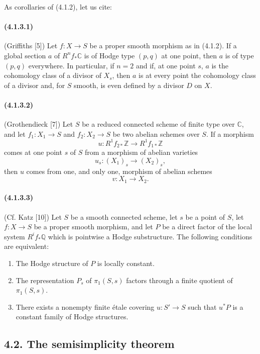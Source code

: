 \documentclass[10pt]{article}
\newcommand{\C}{\mathbb C}
\newcommand{\Q}{\mathbb Q}
\newcommand{\Z}{\mathbb Z}
\begin{document}
As corollaries of (4.1.2), let us cite:

\paragraph{(4.1.3.1)} (Griffiths [5]) Let $f:X\to S$ be a proper smooth morphism as in (4.1.2). If a global section $a$ of $R^nf_*\C$ is of Hodge type $(p,q)$ at one point, then $a$ is of type $(p,q)$ everywhere. In particular, if $n=2$ and if, at one point $s$, $a$ is the cohomology class of a divisor of $X_s$, then $a$ is at every point the cohomology class of a divisor and, for $S$ smooth, is even defined by a divisor $D$ on $X$.

\paragraph{(4.1.3.2)} (Grothendieck [7]) Let $S$ be a reduced connected scheme of finite type over $\C$, and let $f_1:X_1\to S$ and $f_2:X_2\to S$ be two abelian schemes over $S$. If a morphism
\[
u:R^1f_{2*}\Z\longrightarrow R^1f_{1*}\Z
\]
comes at one point $s$ of $S$ from a morphism of abelian varieties
\[
u_s:(X_1)_s\longrightarrow (X_2)_s,
\]
then $u$ comes from one, and only one, morphism of abelian schemes
\[
v:X_1\longrightarrow X_2.
\]

\paragraph{(4.1.3.3)} (Cf. Katz [10]) Let $S$ be a smooth connected scheme, let $s$ be a point of $S$, let $f:X\to S$ be a proper smooth morphism, and let $P$ be a direct factor of the local system $R^if_*\Q$ which is pointwise a Hodge substructure. The following conditions are equivalent:
\begin{enumerate}[label=\alph*)]
\item The Hodge structure of $P$ is locally constant.
\item The representation $P_s$ of $\pi_1(S,s)$ factors through a finite quotient of $\pi_1(S,s)$.
\item There exists a nonempty finite étale covering $u:S'\to S$ such that $u^*P$ is a constant family of Hodge structures.
\end{enumerate}

\subsection*{4.2. The semisimplicity theorem}
\end{document}
